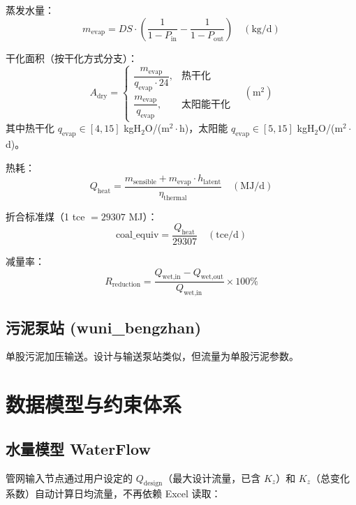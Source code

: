 \documentclass[12pt,a4paper]{ctexart}
\begin{document}
蒸发水量：
\begin{equation}
m_{\text{evap}} = DS \cdot \left(\frac{1}{1-P_{\text{in}}} - \frac{1}{1-P_{\text{out}}}\right) \quad (\text{kg/d})
\end{equation}

干化面积（按干化方式分支）：
\begin{equation}
A_{\text{dry}} = \begin{cases}
\dfrac{m_{\text{evap}}}{q_{\text{evap}} \cdot 24}, & \text{热干化}\\[8pt]
\dfrac{m_{\text{evap}}}{q_{\text{evap}}}, & \text{太阳能干化}
\end{cases} \quad (\text{m}^2)
\end{equation}
其中热干化 $q_{\text{evap}} \in [4, 15]$ kgH$_2$O/(m$^2\cdot$h)，太阳能 $q_{\text{evap}} \in [5, 15]$ kgH$_2$O/(m$^2\cdot$d)。

热耗：
\begin{equation}
Q_{\text{heat}} = \frac{m_{\text{sensible}} + m_{\text{evap}} \cdot h_{\text{latent}}}{\eta_{\text{thermal}}} \quad (\text{MJ/d})
\end{equation}

折合标准煤（1 tce $= 29307$ MJ）：
\begin{equation}
\text{coal\_equiv} = \frac{Q_{\text{heat}}}{29307} \quad (\text{tce/d})
\end{equation}

减量率：
\begin{equation}
R_{\text{reduction}} = \frac{Q_{\text{wet,in}} - Q_{\text{wet,out}}}{Q_{\text{wet,in}}} \times 100\%
\end{equation}

\subsection{污泥泵站 (wuni\_bengzhan)}
单股污泥加压输送。设计与输送泵站类似，但流量为单股污泥参数。

\section{数据模型与约束体系}

\subsection{水量模型 WaterFlow}
管网输入节点通过用户设定的 $Q_{\text{design}}$（最大设计流量，已含 $K_z$）和 $K_z$（总变化系数）自动计算日均流量，不再依赖 Excel 读取：
\end{document}
